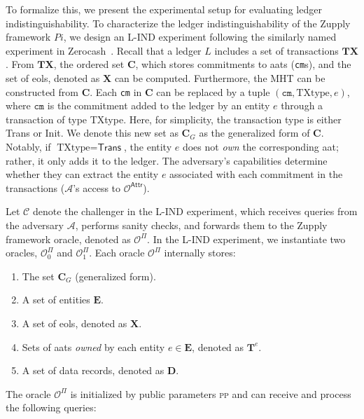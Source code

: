  To formalize this, we present the experimental setup for evaluating ledger indistinguishability. To characterize the ledger indistinguishability of the Zupply framework $Pi$, we design an \textsf{L-IND} experiment following the similarly named experiment in Zerocash~\cite{zcash-proc}.  
Recall that a ledger $L$ includes a set of transactions $\mathbf{TX}$. From $\mathbf{TX}$,  the ordered set $\mathbf{C}$, which stores commitments to \gls{aat}s (\texttt{cm}s), and the set of \gls{eol}s, denoted as $\mathbf{X}$ can be computed. Furthermore, the \textsf{MHT} can be constructed from $\mathbf{C}$.
Each \texttt{cm} in $\mathbf{C}$  can be replaced by a tuple $(\texttt{cm}, \text{TXtype}, e)$, where $\texttt{cm}$ is the commitment added to the ledger by an entity $e$ through a transaction of type TXtype. Here, for simplicity, the transaction type is either \textsf{Trans} or \textsf{Init}. We denote this new set as $\mathbf{C}_G$ as the generalized form of $\mathbf{C}$.  Notably, if $\text{TXtype} = \textsf{Trans}$, the entity $e$ does not \textit{own} the corresponding \gls{aat}; rather, it only adds it to the ledger. The adversary’s capabilities determine whether they can extract the entity $e$ associated with each commitment in the transactions ($\mathcal{A}$'s access to $\mathcal{O}^\mathsf{Attr}$). 

Let $\mathcal{C}$ denote the challenger in the \textsf{L-IND} experiment, which receives queries from the adversary $\mathcal{A}$, performs sanity checks, and forwards them to the Zupply framework oracle, denoted as $\mathcal{O}^\Pi$. In the \textsf{L-IND} experiment, we instantiate two oracles, $\mathcal{O}_0^\Pi$ and $\mathcal{O}_1^\Pi$.  Each oracle $\mathcal{O}^\Pi$ internally stores:  
\begin{enumerate}
	\item The set $\mathbf{C}_G$ (generalized form).
	\item A set of entities $\mathbf{E}$.
	\item A set of \gls{eol}s, denoted as $\mathbf{X}$.
	\item Sets of \gls{aat}s \textit{owned} by each entity $e \in \mathbf{E}$, denoted as $\mathbf{T}^e$.
	\item A set of data records, denoted as $\mathbf{D}$.
\end{enumerate}

The oracle $\mathcal{O}^\Pi$ is initialized by public parameters \textsc{pp} and can receive and process the following queries:


